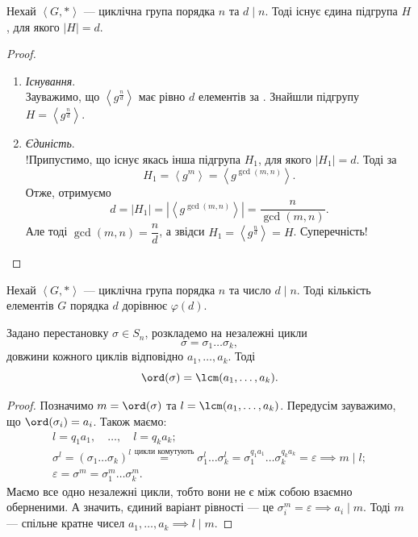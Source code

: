 \documentclass{math_library}
\begin{document}
\begin{theorem}
\label{from_generated_group_get_subgroup}
Нехай $\left< G, *\right>$ --- циклічна група порядка $n$ та $d \mid n$. Тоді існує єдина підгрупа $H$, для якого $|H| = d$.
\end{theorem}

\begin{proof}
\begin{enumerate}[topsep=0pt,wide=0pt,label={\Roman*.}]
\item \textit{Існування}.\\
Зауважимо, що $\left< g^{\frac{n}{d}} \right>$ має рівно $d$ елементів за . Знайшли підгрупу $H = \left< g^{\frac{n}{d}} \right>$.

\item \textit{Єдиність}.\\
!Припустимо, що існує якась інша підгрупа $H_1$, для якого $|H_1| = d$. Тоді за  \[
H_1 = \left<g^m\right> = \left<g^{\gcd(m,n)}\right>.
\]
Отже, отримуємо \[
d = |H_1| = \left|\left<g^{\gcd(m,n)}\right>\right| = \dfrac{n}{\gcd(m,n)}. 
\]
Але тоді $\gcd(m,n) = \dfrac{n}{d}$, а звідси $H_1 = \left< g^{\frac{n}{d}} \right> = H$. Суперечність! \qedhere
\end{enumerate}
\end{proof}

\begin{corollary}
Нехай $\left< G, *\right>$ --- циклічна група порядка $n$ та число $d \mid n$. Тоді кількість елементів $G$ порядка $d$ дорівнює $\varphi(d)$.
\end{corollary}

\begin{theorem}
Задано перестановку $\sigma \in S_n$, розкладемо на незалежні цикли \[\sigma = \sigma_1 \dots \sigma_k, \] довжини кожного циклів відповідно $a_1,\dots,a_k$. Тоді \[
\ord (\sigma) = \lcm(a_1,\dots,a_k).
\]
\end{theorem}

\begin{proof}
Позначимо $m = \ord(\sigma)$ та $l = \lcm(a_1,\dots,a_k)$. Передусім зауважимо, що $\ord(\sigma_i) = a_i$. Також маємо:
\begin{align*}
l = q_1a_1, \quad \dots, \quad l = q_ka_k; \\
\sigma^l = (\sigma_1 \dots \sigma_k)^l\overset{\text{цикли комутують}}{=} \sigma_1^l \dots \sigma_k^l = \sigma_1^{q_1 a_1} \dots \sigma_k^{q_k a_k} = \varepsilon \implies m \mid l; \\
\varepsilon = \sigma^m = \sigma_1^m \dots \sigma_k^m.
\end{align*}
Маємо все одно незалежні цикли, тобто вони не є між собою взаємно оберненими. А значить, єдиний варіант рівності --- це $\sigma_i^m = \varepsilon \implies a_i \mid m$. Тоді $m$ --- спільне кратне чисел $a_1,\dots,a_k \implies l \mid m$.
\end{proof}
\end{document}
